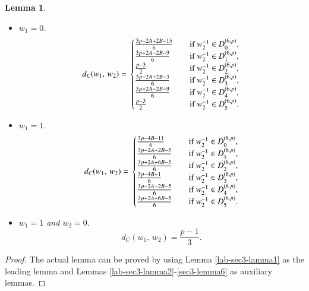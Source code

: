 \documentclass[letter]{ieice}
\newtheorem{sec3_lemma7}[sec3_lemma1]{Lemma}
\begin{document}
\begin{sec3_lemma7}
\begin{itemize}
\begin{itemize}
\item $ w_{1}=0 $.
\begin{equation*}
d_{\mathit{C}}(w_{1},\,w_{2})=\\
\begin{cases}
\frac{3p-2A+2B-15}{6}&\quad \mbox{if}\  w^{-1}_{2} \in  D_{0}^{(6,p)},\\
\frac{3p+2A-2B-9}{6}&\quad \mbox{if}\  w^{-1}_{2} \in  D_{1}^{(6,p)},\\
\frac{p-3}{2}&\quad \mbox{if}\  w^{-1}_{2} \in  D_{2}^{(6,p)},\\
\frac{3p-2A+2B-3}{6}&\quad \mbox{if}\  w^{-1}_{2} \in  D_{3}^{(6,p)},\\
\frac{3p+2A-2B-9}{6}&\quad \mbox{if}\  w^{-1}_{2} \in  D_{4}^{(6,p)},\\
\frac{p-3}{2}&\quad \mbox{if}\  w^{-1}_{2} \in  D_{5}^{(6,p)}.
\end{cases}
\end{equation*}
\item $ w_{1}=1 $.
\begin{equation*}
d_{\mathit{C}}(w_{1},\,w_{2})=\\
\begin{cases}
\frac{3p-4B-11}{6}&\quad \mbox{if}\  w^{-1}_{2} \in  D_{0}^{(6,p)},\\
\frac{3p-2A-2B-5}{6}&\quad \mbox{if}\  w^{-1}_{2} \in  D_{1}^{(6,p)},\\
\frac{3p+2A+6B-5}{6}&\quad \mbox{if}\  w^{-1}_{2} \in  D_{2}^{(6,p)},\\
\frac{3p-4B+1}{6}&\quad \mbox{if}\  w^{-1}_{2} \in  D_{3}^{(6,p)},\\
\frac{3p-2A-2B-5}{6}&\quad \mbox{if}\  w^{-1}_{2} \in  D_{4}^{(6,p)},\\
\frac{3p+2A+6B-5}{6}&\quad \mbox{if}\  w^{-1}_{2} \in  D_{5}^{(6,p)}.
\end{cases}                   
\end{equation*}
\item $ w_{1}=1 $ and $ w_{2}=0 $.
\begin{equation*}
d_{\mathit{C}}(w_{1},\,w_{2})=\frac{p-1}{3}.
\end{equation*}
\end{itemize}           
\end{itemize}
\end{sec3_lemma7}
\begin{proof}
The actual lemma can be proved by using Lemma \ref{lab-sec3-lamma1} as the leading lemma and Lemmas \ref{lab-sec3-lamma2}-\ref{sec3-lemma6} as auxiliary lemmas.
\end{proof}
\end{document}
